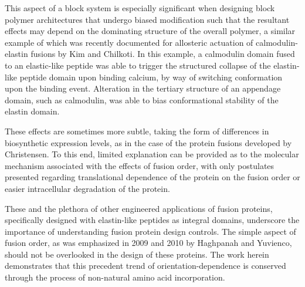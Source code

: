 \begin{refsection}
This aspect of a block system is especially significant when designing block
polymer architectures that undergo biased modification such that the resultant
effects may depend on the dominating structure of the overall polymer, a similar
example of which was recently documented for allosteric actuation of
calmodulin-elastin fusions by Kim and Chilkoti.\cite{Kim2008a} In this example,
a calmodulin domain fused to an elastic-like peptide was able to trigger the
structured collapse of the elastin-like peptide domain upon binding calcium, by
way of switching conformation upon the binding event. Alteration in the tertiary
structure of an appendage domain, such as calmodulin, was able to bias
conformational stability of the elastin domain.

These effects are sometimes more subtle, taking the form of differences in
biosynthetic expression levels, as in the case of the protein fusions developed
by Christensen.\cite{Christensen2009} To this end, limited explanation can be
provided as to the molecular mechanism associated with the effects of fusion
order, with only postulates presented regarding translational dependence of the
protein on the fusion order or easier intracellular degradation of the protein.

These and the plethora of other engineered applications of fusion proteins,
specifically designed with elastin-like peptides as integral domains, underscore
the importance of understanding fusion protein design controls. The simple
aspect of fusion order, as was emphasized in 2009 and 2010 by Haghpanah and
Yuvienco,\cite{Haghpanah2009,Haghpanah2010} should not be overlooked in the
design of these proteins. The work herein demonstrates that this precedent trend
of orientation-dependence is conserved through the process of non-natural amino
acid incorporation.


\end{refsection}
